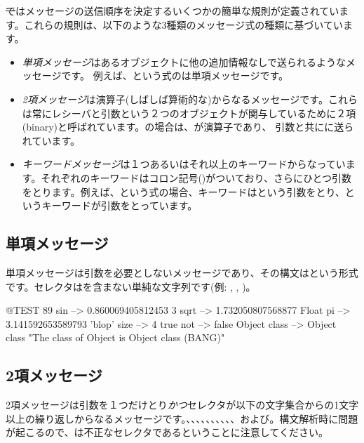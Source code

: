\documentclass[a4paper,10pt,twoside]{book}
\begin{document}
\st ではメッセージの送信順序を決定するいくつかの簡単な規則が定義されています。これらの規則は、以下のような3種類のメッセージ式の種類に基づいています。
\begin{itemize}
\item \emph{単項メッセージ}はあるオブジェクトに他の追加情報なしで送られるようなメッセージです。 例えば、という式のは単項メッセージです。
\item  \emph{2項メッセージ}は演算子(しばしば算術的な)からなるメッセージです。これらは常にレシーバと引数という２つのオブジェクトが関与しているために２項(binary)と呼ばれています。の場合は、\ct{+}が演算子であり、 引数と共にに送られています。
\item  \emph{キーワードメッセージ}は１つあるいはそれ以上のキーワードからなっています。それぞれのキーワードはコロン記号(\ct{:})がついており、さらにひとつ引数をとります。例えば、という式の場合、キーワードはという引数をとり、というキーワードが引数をとっています。
\end{itemize}

\subsection{単項メッセージ}
単項メッセージは引数を必要としないメッセージであり、その構文はという形式です。セレクタは\ct{:}を含まない単純な文字列です(例: , , )。
\begin{code}{@TEST}
89 sin           --> 0.860069405812453
3 sqrt           --> 1.732050807568877
Float pi         --> 3.141592653589793
'blop' size     --> 4
true not        --> false
Object class --> Object class  "The class of Object is Object class (BANG)"
\end{code}


\subsection{2項メッセージ} 
2項メッセージは引数を１つだけとり\emph{かつ}セレクタが以下の文字集合からの1文字以上の繰り返しからなるメッセージです。\ct{+}、\ct{-}、\ct{*}、\ct{/}、\ct{&}、\ct{=}、\ct{>}、\ct{|}、\ct{<}、\ct{~}、および。構文解析時に問題が起こるので、\ct{--}は不正なセレクタであるということに注意してください。
\end{document}
